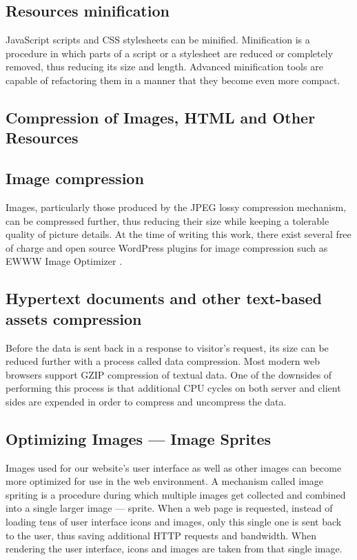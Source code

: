 \subsection*{Resources minification}

JavaScript scripts and CSS stylesheets can be minified. Minification is a procedure in which parts of a script or a stylesheet are reduced or completely removed, thus reducing its size and length. Advanced minification tools are capable of refactoring them in a manner that they become even more compact.

\subsection{Compression of Images, HTML and Other Resources}

\subsection*{Image compression}

Images, particularly those produced by the JPEG lossy compression mechanism, can be compressed further, thus reducing their size while keeping a tolerable quality of picture details. At the time of writing this work, there exist several free of charge and open source WordPress plugins for image compression such as EWWW Image Optimizer \cite{WP-Plugin:EWWW-Image-Optimizer}.

\subsection*{Hypertext documents and other text-based assets compression}

Before the data is sent back in a response to visitor’s request, its size can be reduced further with a process called data compression. \cite{Study:Google-compression} Most modern web browsers \cite{Study:SO-gzip-browser-support} support GZIP compression of textual data. One of the downsides of performing this process is that additional CPU cycles on both server and client sides are expended in order to compress and uncompress the data.

\subsection{Optimizing Images — Image Sprites}

Images used for our website's user interface as well as other images can become more optimized for use in the web environment. A mechanism called image spriting \cite{Study:CSSwizardy-image-spriting} is a procedure during which multiple images get collected and combined into a single larger image — sprite. When a web page is requested, instead of loading tens of user interface icons and images, only this single one is sent back to the user, thus saving additional HTTP requests and bandwidth. When rendering the user interface, icons and images are taken from that single image.

